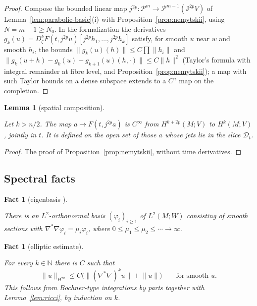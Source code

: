 \documentclass[11pt,reqno]{amsart}
\newtheorem{lemma}[theorem]{Lemma}
\newtheorem{fact}[theorem]{Fact}
\theoremstyle{definition}
\theoremstyle{remark}
\newcommand{\N}{\mathbb{N}}
\newcommand{\Pp}{\mathcal{P}}
\newcommand{\Dom}{\mathcal{D}}
\newcommand{\Jet}{\mathrm{J}}
\newcommand{\norm}[1]{\lVert #1\rVert}
\newcommand{\Lap}{\nabla^{*}\nabla}
\newcommand{\lean}[1]{}
\newcommand{\uses}[1]{}
\newcommand{\source}[1]{}
\numberwithin{equation}{section}
\begin{document}
\begin{proof}
\uses{prop:nemytskii, lem:parabolic-basic}
Compose the bounded linear map $j^{2p}\colon\Pp^m\to\Pp^{m-1}(\Jet^{2p}V)$ of
Lemma~\ref{lem:parabolic-basic}(i) with Proposition~\ref{prop:nemytskii}, using $N=m-1\ge N_0$. In the formalization the derivatives $g_k(u)=D^k_\zeta F(t,j^{2p}u)[j^{2p}h_1,\dots,j^{2p}h_k]$
satisfy, for smooth $u$ near $w$ and smooth $h_i$, the bounds
$\norm{g_k(u)(h)}\le C\prod\norm{h_i}$ and
$\norm{g_k(u+h)-g_k(u)-g_{k+1}(u)(h,\cdot)}\le C\norm h^2$ (Taylor's formula with integral
remainder at fibre level, and Proposition~\ref{prop:nemytskii}); a map with such Taylor bounds on a
dense subspace extends to a $C^n$ map on the completion.
\end{proof}

\begin{lemma}[spatial composition]\label{lem:spatial-nemytskii}
\lean{ShortTime.EquationData.contDiff_spatialOp}
\uses{def:data, def:sobolev, fact:sobolev}
Let $k>n/2$. The map $a\mapsto F(t,j^{2p}a)$ is $C^\infty$ from $H^{k+2p}(M;V)$ to $H^k(M;V)$, jointly
in $t$. It is defined on the open set of those $a$ whose jets lie in the slice $\Dom_t$.
\end{lemma}

\begin{proof}
The proof of Proposition~\ref{prop:nemytskii}, without time derivatives.
\end{proof}

\subsection{Spectral facts}

\begin{fact}[eigenbasis {\cite{Aubin}}]\label{fact:eigen}
\source{DG: Analysis/Spectral/Tensor (TensorEigenIdx; tensor bundles)}
There is an $L^2$-orthonormal basis $(\varphi_i)_{i\ge1}$ of $L^2(M;W)$ consisting of smooth sections
with $\Lap\varphi_i=\mu_i\varphi_i$, where $0\le\mu_1\le\mu_2\le\cdots\to\infty$.
\end{fact}

\begin{fact}[elliptic estimate]\label{fact:elliptic}
\uses{def:sobolev}
\source{DG: Analysis/Spectral/Tensor/SobolevScale/Jet/Bounds/IteratedCovariantDerivative (hsJet\_le, hs\_le\_jet; covariant tensors of every rank)}
For every $k\in\N$ there is $C$ such that
\[
  \norm{u}_{H^{2k}}\le C\bigl(\norm{(\Lap)^ku}+\norm u\bigr)\qquad\text{for smooth }u.
\]
This follows from Bochner-type integrations by parts together with Lemma~\ref{lem:ricci}, by
induction on $k$.
\end{fact}
\end{document}
